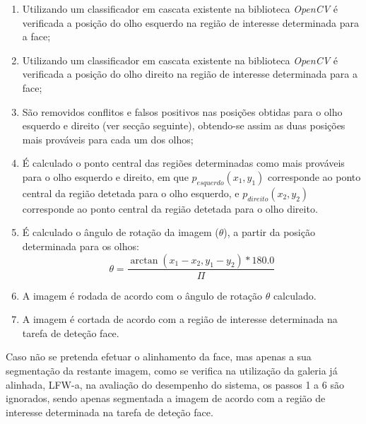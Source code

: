 \begin{enumerate}
\item Utilizando um classificador em cascata existente na biblioteca \textit{OpenCV} é verificada a posição do olho esquerdo na região de interesse determinada para a face;
\item Utilizando um classificador em cascata existente na biblioteca \textit{OpenCV} é verificada a posição do olho direito na região de interesse determinada para a face;
\item São removidos conflitos e falsos positivos nas posições obtidas para o olho esquerdo e direito (ver secção seguinte), obtendo-se assim as duas posições mais prováveis para cada um dos olhos;
\item É calculado o ponto central das regiões determinadas como mais prováveis para o olho esquerdo e direito, em que $p_{esquerdo}(x_1,y_1)$ corresponde ao ponto central da região detetada para o olho esquerdo, e  $p_{direito}(x_2,y_2)$ corresponde ao ponto central da região detetada para o olho direito.
\item É calculado o ângulo de rotação da imagem ($\theta$), a partir da posição determinada para os olhos:
\begin{equation}
\theta = \frac{\arctan(x_1 - x_2, y_1 - y_2) * 180.0}{\Pi}
\end{equation}
\item A imagem é rodada de acordo com o ângulo de rotação $\theta$ calculado.
\item A imagem é cortada de acordo com a região de interesse determinada na tarefa de deteção face.
\end{enumerate}

Caso não se pretenda efetuar o alinhamento da face, mas apenas a sua segmentação da restante imagem, como se verifica na utilização da galeria já alinhada, LFW-a, na avaliação do desempenho do sistema, os passos 1 a 6 são ignorados, sendo apenas segmentada a imagem de acordo com a região de interesse determinada na tarefa de deteção face.

